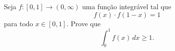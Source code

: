 Seja \(f \colon [0,1] \to (0,\infty)\) uma função integrável tal que
\[
f(x)\cdot f(1-x)=1
\]
para todo \(x\in[0,1]\). Prove que
\[
\int_0^1 f(x)\,dx \ge 1.
\]
